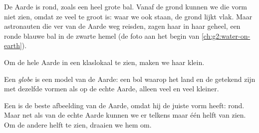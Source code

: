 De Aarde is rond, zoals een heel grote bal. Vanaf de grond kunnen we die
vorm niet zien, omdat ze veel te groot is: waar we ook staan, de grond lijkt
vlak. Maar astronauten die ver van de Aarde weg reisden, zagen haar in haar
geheel, een ronde blauwe bal in de zwarte hemel (de foto aan het begin van
\cref{ch:g2:water-on-earth}).

Om de hele Aarde in een klaslokaal te zien, maken we haar klein.

\begin{definition}[Globe]\label{def:g3:continents-and-oceans:globe}
Een \emph{globe} is een model van de Aarde: een bol waarop
het land en de  getekend zijn met dezelfde vormen als op de echte
Aarde, alleen veel en veel kleiner.
\end{definition}

Een  is de beste afbeelding van de Aarde, omdat hij de juiste vorm
heeft: rond. Maar net als van de echte Aarde kunnen we er telkens maar één
helft van zien. Om de andere helft te zien, draaien we hem om.

